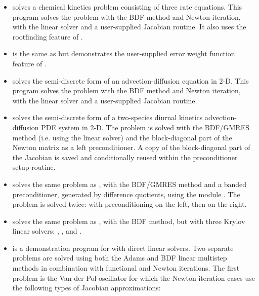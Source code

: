 \begin{itemize}
\item {}
  solves a chemical kinetics problem consisting of three rate equations.
  \newline
  This program solves the problem with the BDF method and Newton          
  iteration, with the {\cvdense} linear solver and a user-supplied    
  Jacobian routine.  It also uses the rootfinding feature of {\cvode}.
\item {}
  is the same as  but demonstrates the user-supplied error
  weight function feature of {\cvode}.
\item {}
  solves the semi-discrete form of an advection-diffusion equation in 2-D. 
  \newline
  This program solves the problem with the BDF method and Newton          
  iteration, with the {\cvband} linear solver and a user-supplied     
  Jacobian routine.
\item {}
  solves the semi-discrete form of a two-species diurnal kinetics
  advection-diffusion PDE system in 2-D.
  \newline
  The problem is solved with the BDF/GMRES method (i.e.    
  using the {\cvspgmr} linear solver) and the block-diagonal part of the  
  Newton matrix as a left preconditioner. A copy of the block-diagonal 
  part of the Jacobian is saved and conditionally reused within the    
  preconditioner setup routine.
\item {}
  solves the same problem as , with the BDF/GMRES method 
  and a banded preconditioner, generated by difference quotients, 
  using the module {\cvbandpre}.
  \newline
  The problem is solved twice: with preconditioning on the left,
  then on the right.
\item {}
  solves the same problem as , with the BDF method, but with
  three Krylov linear solvers: {\cvspgmr}, {\cvspbcg}, and {\cvsptfqmr}.
\item {}
  is a demonstration program for {\cvode} with direct linear solvers.
  \newline
  Two separate problems are solved using both the Adams and BDF linear
  multistep methods in combination with functional and Newton
  iterations. 
  \newline
  The first problem is the Van der Pol oscillator for which 
  the Newton iteration cases use the following types of Jacobian approximations:

\end{itemize}
